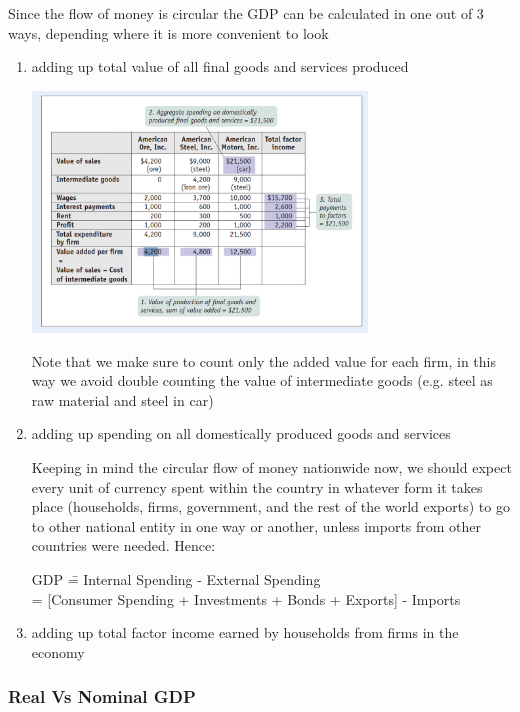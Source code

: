 \documentclass[english,course,draft]{Notes}
\begin{document}
\par{Since the flow of money is circular the GDP can be calculated in one out of 3 ways, depending where it is more convenient to look}

\begin{enumerate}
	\item adding up total value of all final goods and services produced
	
	\includegraphics[width=0.7\textwidth]{GDP}
	
	\par{Note that we make sure to count only the added value for each firm, in this way we avoid double counting the value of intermediate goods (e.g. steel as raw material and steel in car)}
	
	\item adding up spending on all domestically produced goods and services
	
	\par{Keeping in mind the circular flow of money nationwide now, we should expect every unit of currency spent within the country in whatever form it takes place (households, firms, government, and the
rest of the world exports) to go to other national entity in one way or another, unless imports from other countries were needed. Hence:}
	
	\begin{tabbing}
  GDP  \== Internal Spending - External Spending\\
  \>= [Consumer Spending + Investments + Bonds + Exports] - Imports
  	\end{tabbing}
	
	\item adding up total factor income earned by households from firms in the economy
\end{enumerate}

\subsubsection{Real Vs Nominal GDP}
\end{document}
